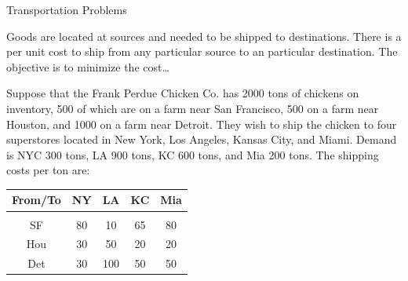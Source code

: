 \documentclass{article}
\begin{document}
\begin{eg}{Transportation Problems}

    Goods are located at sources and needed to be shipped to destinations. There 
    is a per unit cost to ship from any particular source to an particular 
    destination. The objective is to minimize the cost\dots

    Suppose that the Frank Perdue Chicken Co. has 2000 tons of chickens on inventory,
    500 of which are on a farm near San Francisco, 500 on a farm near Houston,
    and 1000 on a farm near Detroit. They wish to ship the chicken to four superstores 
    located in New York, Los Angeles, Kansas City, and Miami. Demand is NYC 300 tons,
    LA 900 tons, KC 600 tons, and Mia 200 tons. The shipping costs per ton are:\\
    \begin{tabular}
        { |c | c | c | c | c | }
        \hline
        From/To & NY & LA & KC & Mia \\
        \hline \\
        SF & 80 & 10 & 65 & 80 \\
        \hline
        Hou & 30 & 50 & 20 & 20 \\
        \hline
        Det & 30 & 100 & 50 & 50 \\
        \hline
    \end{tabular}


\end{eg}
\end{document}
